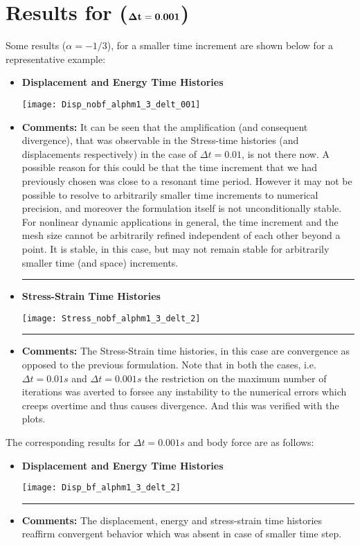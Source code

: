 \section*{Results for ($\bf \Delta t=0.001$)}
Some results ($\alpha=-1/3$), for a smaller time increment are shown below for a representative example: 
\begin{itemize}
\item {\bf Displacement and Energy Time Histories}
\begin{center}
\texttt{[image: Disp\_nobf\_alphm1\_3\_delt\_001]}
\end{center}
\item {\bf Comments: } It can be seen that the amplification (and consequent divergence), that was observable in the Stress-time histories (and displacements respectively) in the case of $\Delta t = 0.01$, is not there now. A possible reason for this could be that the time increment that we had previously chosen was close to a resonant time period. However it may not be possible to resolve to arbitrarily smaller time increments to numerical precision, and moreover the formulation itself is not unconditionally stable. For nonlinear dynamic applications in general, the time increment and the mesh size cannot be arbitrarily refined independent of each other beyond a point. It is stable, in this case, but may not remain stable for arbitrarily smaller time (and space) increments. \\ 
\hrule
\newpage \item {\bf Stress-Strain Time Histories}
\begin{center}
\texttt{[image: Stress\_nobf\_alphm1\_3\_delt\_2]}
\end{center}
\hrule
\item {\bf Comments: } 
The Stress-Strain time histories, in this case are convergence as opposed to the previous formulation. Note that in both the cases, i.e. $\Delta t = 0.01s$ and $\Delta t = 0.001s$ the restriction on the maximum number of iterations was averted to forsee any instability to the numerical errors which creeps overtime and thus causes divergence. And this was verified with the plots.
\end{itemize} 
\newpage
The corresponding results for $\Delta t = 0.001s$ and body force are as follows: 
\begin{itemize}
\item {\bf Displacement and Energy Time Histories}
\begin{center}
\texttt{[image: Disp\_bf\_alphm1\_3\_delt\_2]}
\end{center}\hrule
\item {\bf Comments: } The displacement, energy and stress-strain time histories reaffirm convergent behavior which was absent in case of smaller time step. 
\newpage
\end{itemize}
